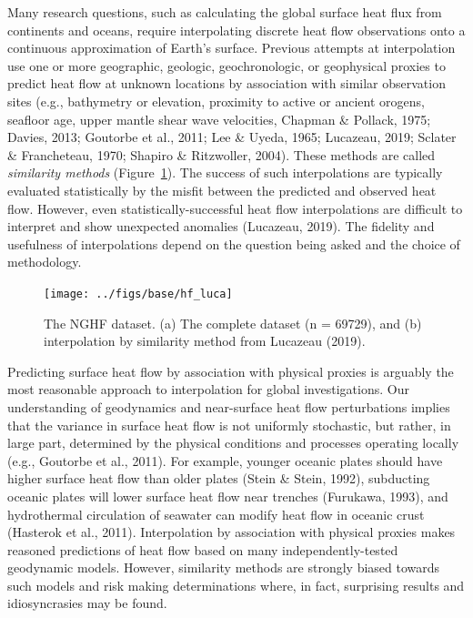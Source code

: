 \documentclass[draft,linenumbers]{agujournal2018}
\begin{document}
Many research questions, such as calculating the global surface heat
flux from continents and oceans, require interpolating discrete heat
flow observations onto a continuous approximation of Earth's surface.
Previous attempts at interpolation use one or more geographic, geologic,
geochronologic, or geophysical proxies to predict heat flow at unknown
locations by association with similar observation sites (e.g.,
bathymetry or elevation, proximity to active or ancient orogens,
seafloor age, upper mantle shear wave velocities, Chapman \& Pollack,
1975; Davies, 2013; Goutorbe et al., 2011; Lee \& Uyeda, 1965; Lucazeau,
2019; Sclater \& Francheteau, 1970; Shapiro \& Ritzwoller, 2004). These
methods are called \emph{similarity methods} (Figure~\ref{fig:lucahf}).
The success of such interpolations are typically evaluated statistically
by the misfit between the predicted and observed heat flow. However,
even statistically-successful heat flow interpolations are difficult to
interpret and show unexpected anomalies (Lucazeau, 2019). The fidelity
and usefulness of interpolations depend on the question being asked and
the choice of methodology.

\begin{figure}[h]

{\centering \texttt{[image: ../figs/base/hf\_luca]} 

}

\caption{The NGHF dataset. (a) The complete dataset (n = 69729), and (b) interpolation by similarity method from Lucazeau (2019).}\label{fig:lucahf}
\end{figure}

Predicting surface heat flow by association with physical proxies is
arguably the most reasonable approach to interpolation for global
investigations. Our understanding of geodynamics and near-surface heat
flow perturbations implies that the variance in surface heat flow is not
uniformly stochastic, but rather, in large part, determined by the
physical conditions and processes operating locally (e.g., Goutorbe et
al., 2011). For example, younger oceanic plates should have higher
surface heat flow than older plates (Stein \& Stein, 1992), subducting
oceanic plates will lower surface heat flow near trenches (Furukawa,
1993), and hydrothermal circulation of seawater can modify heat flow in
oceanic crust (Hasterok et al., 2011). Interpolation by association with
physical proxies makes reasoned predictions of heat flow based on many
independently-tested geodynamic models. However, similarity methods are
strongly biased towards such models and risk making determinations
where, in fact, surprising results and idiosyncrasies may be found.
\end{document}
